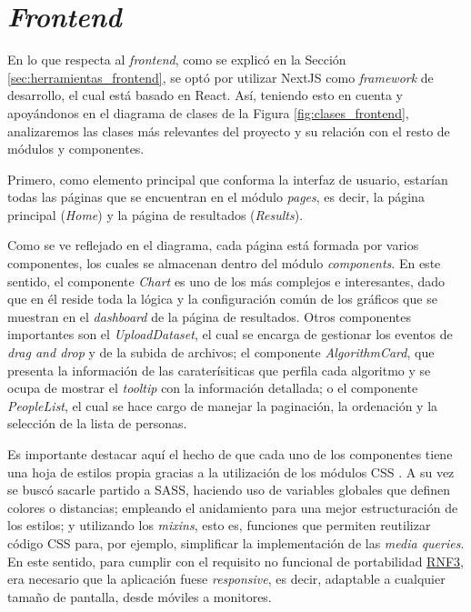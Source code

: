 \section{\textit{Frontend}}

En lo que respecta al \textit{frontend}, como se explicó en la Sección \ref{sec:herramientas_frontend}, se optó
por utilizar NextJS como \textit{framework} de desarrollo, el cual está basado en React. Así, teniendo esto en cuenta y apoyándonos
en el diagrama de clases de la Figura \ref{fig:clases_frontend}, analizaremos
las clases más relevantes del proyecto y su relación con el resto de módulos y componentes.

\bigskip
Primero, como elemento principal que conforma la interfaz de usuario, estarían todas las páginas que se encuentran en el módulo \textit{pages}, es decir,
la página principal (\textit{Home}) y la página de resultados (\textit{Results}).

\bigskip
Como se ve reflejado en el diagrama, cada página está formada por varios componentes, los cuales se almacenan dentro del módulo \textit{components}.
En este sentido, el componente \textit{Chart} es uno de los más complejos e interesantes, dado que en él reside toda la lógica y la configuración común
de los gráficos que se muestran en el \textit{dashboard} de la página de resultados. Otros componentes importantes son el \textit{UploadDataset},
el cual se encarga de gestionar los eventos de \textit{drag and drop} y de la subida de archivos; el componente \textit{AlgorithmCard}, que
presenta la información de las caraterísiticas que perfila cada algoritmo y se ocupa de mostrar el \textit{tooltip} con la información detallada;
o el componente \textit{PeopleList}, el cual se hace cargo de manejar la paginación, la ordenación y la selección de la lista de personas.

\bigskip
Es importante
destacar aquí el hecho de que cada uno de los componentes tiene una hoja de estilos propia gracias a la utilización de los módulos CSS \cite{cssmodules}. A su vez
se buscó sacarle partido a SASS, haciendo uso de variables globales que definen colores o distancias; empleando el anidamiento para una mejor
estructuración de los estilos; y utilizando los \textit{mixins}, esto es, funciones que permiten reutilizar código CSS para, por ejemplo, simplificar la implementación de las \textit{media queries}. En este
sentido, para cumplir con el requisito no funcional de portabilidad \hyperref[req:rnf3]{RNF3},
era necesario que la aplicación fuese \textit{responsive}, es decir, adaptable a cualquier tamaño de pantalla, desde móviles a monitores.

